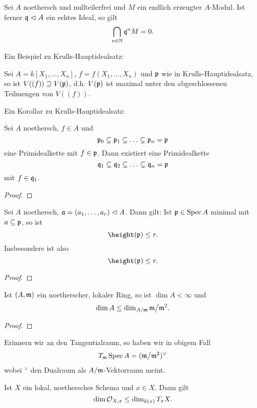 \begin{lemma}
    Sei $A$ noethersch und nullteilerfrei und $M$ ein endlich erzeugter
    $A$-Modul. Ist ferner $\mathfrak{q} \vartriangleleft A$ ein echtes Ideal, so gilt
    \[\bigcap_{n\in\mathbb{N}} \mathfrak{q}^n M = 0.\]
\end{lemma}

Ein Beispiel zu Krulls-Hauptidealsatz:

\begin{beispiel}
    Sei $A = k[X_1,\ldots,X_n]$, $f  = f(X_1,\ldots,X_n)$ und
    $\mathfrak{p}$ wie in Krulls-Hauptidealsatz, so ist $V((f)) \supseteq V(\mathfrak{p})$, 
    d.h. $V(\mathfrak{p})$ ist maximal unter den abgeschlossenen Teilmengen von $V((f))$. 
\end{beispiel}


Ein Korollar zu Krulls-Hauptidealsatz:
\begin{korollar}
    Sei $A$ noethersch, $f\in A$ und
    \[\mathfrak{p}_0 \subsetneq \mathfrak{p}_1 \subsetneq \ldots \subsetneq \mathfrak{p}_n = \mathfrak{p}\]
    eine Primidealkette mit $f \in \mathfrak{p}$. Dann existiert eine Primidealkette
    \[\mathfrak{q}_1 \subsetneq \mathfrak{q}_2 \subsetneq \ldots \subsetneq \mathfrak{q}_n = \mathfrak{p}\]
    mit $f \in \mathfrak{q}_1$.
\end{korollar}
\begin{proof}
\TODO
\end{proof}

\begin{korollar}
    Sei $A$ noethersch, $\mathfrak{a} = (a_1,\ldots,a_r) \vartriangleleft A$. Dann gilt:
    Ist $\mathfrak{p} \in \operatorname{Spec} A$ minimal mit $a\subseteq \mathfrak{p}$, so ist
    \[\height(\p) \leq r.\]
    Insbesondere ist also
    \[\height(\p) \leq r.\]
\end{korollar}
\begin{proof}
\TODO
\end{proof}

\begin{korollar}
    Ist $(A,\mathfrak{m})$ ein noetherscher, lokaler Ring, so ist $\dim A < \infty$ und
    \[\dim A \leq \dim_{A/\mathfrak{m}} \mathfrak{m}\big/\mathfrak{m}^2.\]
\end{korollar}
\begin{proof}
\TODO
\end{proof}

\begin{bemerkung}
    Erinnern wir an den Tangentialraum, so haben wir in obigem Fall
    \[T_\mathfrak{m}\operatorname{Spec} A = (\mathfrak{m}\big/\mathfrak{m}^2)^\vee \]
    wobei $^\vee$ den Dualraum als $A/\mathfrak{m}$-Vektorraum meint.
\end{bemerkung}

\begin{folgerung}
    Ist $X$ ein lokal, noethersches Schema und $x\in X$. Dann gilt
    \[\dim \mathcal{O}_{X,x} \leq \dim_{k(x)} T_x X.\]
\end{folgerung}



